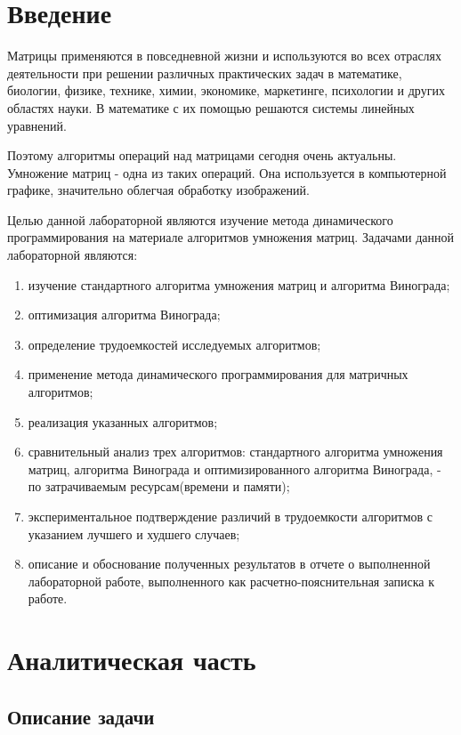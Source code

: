 \chapter*{Введение}\label{Input}

Матрицы применяются в повседневной жизни и используются во всех отраслях деятельности 
при решении различных практических задач в математике, биологии, физике, технике, химии, экономике, маркетинге, 
психологии и других областях науки. В математике с их помощью решаются системы линейных уравнений. 

Поэтому алгоритмы операций над матрицами сегодня очень актуальны. Умножение матриц - одна из таких операций. Она используется
в компьютерной графике, значительно облегчая обработку изображений. 


Целью данной лабораторной являются изучение метода динамического программирования на материале алгоритмов умножения матриц.
Задачами данной лабораторной являются:
\begin{enumerate}
  \item изучение стандартного алгоритма умножения матриц и алгоритма Винограда;
  \item оптимизация алгоритма Винограда;
  \item определение трудоемкостей исследуемых алгоритмов;
  \item применение метода динамического программирования для матричных алгоритмов;
  \item реализация указанных алгоритмов;
  \item сравнительный анализ трех алгоритмов: стандартного алгоритма умножения матриц, алгоритма Винограда и оптимизированного алгоритма Винограда, - по затрачиваемым 
        ресурсам(времени и памяти);
  \item экспериментальное подтверждение различий в трудоемкости алгоритмов с указанием лучшего и худшего случаев;
  \item описание и обоснование полученных результатов в отчете о выполненной лабораторной работе, выполненного как расчетно-пояснительная 
        записка к работе.
\end{enumerate}

\chapter{Аналитическая часть}\label{Analis}

\section{Описание задачи}\label{Matrix}


